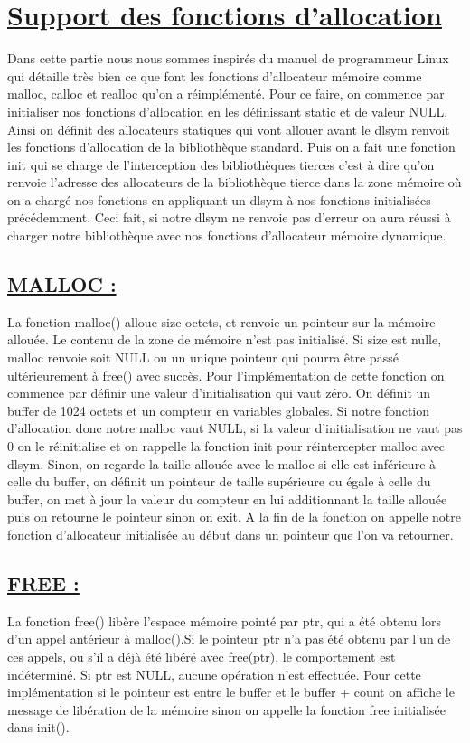 \documentclass[12pt]{article}
\begin{document}
\section{ \underline{Support des fonctions d'allocation}}
{\Large Dans cette partie nous nous sommes inspirés du manuel de programmeur Linux qui détaille très bien ce que font les fonctions d'allocateur mémoire comme malloc, calloc et realloc qu'on a réimplémenté. Pour ce faire, on commence par initialiser nos fonctions d'allocation en les définissant static et de valeur NULL. Ainsi on définit des allocateurs statiques qui vont allouer avant le dlsym renvoit les fonctions d'allocation de la bibliothèque standard. Puis on a fait une fonction init qui se charge de l'interception des bibliothèques tierces c'est à dire qu'on renvoie l'adresse des allocateurs de la bibliothèque tierce dans la zone mémoire où on a chargé nos fonctions en appliquant un dlsym à nos fonctions initialisées précédemment. Ceci fait, si notre dlsym ne renvoie pas d'erreur on aura réussi à charger notre bibliothèque avec nos fonctions d'allocateur mémoire dynamique.}

\subsection{\underline{MALLOC :}}
\begin{Large}
La fonction malloc() alloue size octets, et renvoie un pointeur sur la
mémoire allouée. Le contenu de la zone de mémoire n'est pas initialisé. Si size est nulle, malloc renvoie soit NULL ou un unique pointeur qui pourra être passé ultérieurement à free() avec succès. Pour l'implémentation de cette fonction on commence par définir une valeur d'initialisation qui vaut zéro. On définit un buffer de 1024 octets et un compteur en variables globales. Si notre fonction d'allocation donc notre malloc vaut NULL, si la valeur d'initialisation ne vaut pas 0 on le réinitialise et on rappelle la fonction init pour réintercepter malloc avec dlsym. Sinon, on regarde la taille allouée avec le malloc si elle est inférieure à celle du buffer, on définit un pointeur de taille supérieure ou égale à celle du buffer, on met à jour la valeur du compteur en lui additionnant la taille allouée puis on retourne le pointeur sinon on exit. A la fin de la fonction on appelle notre fonction d'allocateur initialisée au début dans un pointeur que l'on va retourner.
\end{Large}

\subsection{\underline{FREE :}}
\begin{Large}
La fonction  free()  libère l'espace mémoire pointé par ptr, qui a été
obtenu lors d'un appel antérieur à malloc().Si le pointeur ptr n'a pas été obtenu par l'un de ces appels, ou s'il a déjà été libéré avec free(ptr), le comportement est indéterminé. Si ptr est NULL, aucune opération n'est effectuée. Pour cette implémentation si le pointeur est entre le buffer et le buffer + count on affiche le message de libération de la mémoire sinon on appelle la fonction free initialisée dans init().
\end{Large}
\end{document}
